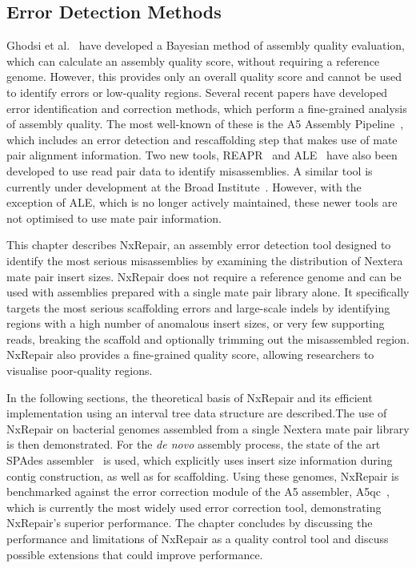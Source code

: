 \subsection{Error Detection Methods}
Ghodsi et al.~\cite{Ghodsi2013} have developed a Bayesian method of assembly quality evaluation, which can calculate an assembly quality score, without requiring a reference genome. However, this provides only an overall quality score and cannot be used to identify errors or low-quality regions. Several recent papers have developed error identification and correction methods, which perform a fine-grained analysis of assembly quality. The most well-known of these is the A5 Assembly Pipeline~\cite{Coil2014, tritt2012}, which includes an error detection and rescaffolding step that makes use of mate pair alignment information. Two new tools, REAPR~\cite{Hunt2013} and ALE~\cite{Clark2013} have also been developed to use read pair data to identify misassemblies. A similar tool is currently under development at the Broad Institute~\cite{pilon2014}. However, with the exception of ALE, which is no longer actively maintained, these newer tools are not optimised to use mate pair information.  

This chapter describes NxRepair, an assembly error detection tool designed to identify the most serious misassemblies by examining the distribution of Nextera mate pair insert sizes. NxRepair does not require a reference genome and can be used with assemblies prepared with a single mate pair library alone. It specifically targets the most serious scaffolding errors and large-scale indels by identifying regions with a high number of anomalous insert sizes, or very few supporting reads, breaking the scaffold and optionally trimming out the misassembled region. NxRepair also provides a fine-grained quality score, allowing researchers to visualise poor-quality regions. 

In the following sections, the theoretical basis of NxRepair and its efficient implementation using an interval tree data structure are described.The use of NxRepair on bacterial genomes assembled from a single Nextera mate pair library is then demonstrated. For the \textit{de novo} assembly process, the state of the art SPAdes assembler~\cite{Bankevich2012} is used, which explicitly uses insert size information during contig construction, as well as for scaffolding. Using these genomes, NxRepair is benchmarked against the error correction module of the A5 assembler, A5qc~\cite{tritt2012}, which is currently the most widely used error correction tool, demonstrating NxRepair's superior performance. The chapter concludes by discussing the performance and limitations of NxRepair as a quality control tool and discuss possible extensions that could improve performance.

